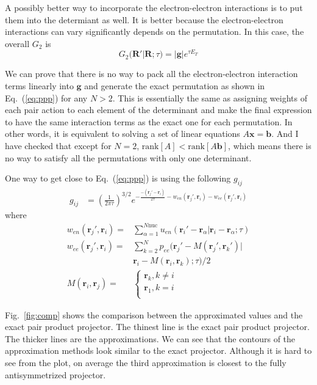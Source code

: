 \documentclass[aps,prl,reprint,groupedaddress]{revtex4-1}
\begin{document}
A possibly better way to incorporate the electron-electron interactions is to put them into the determiant as well.
It is better because the electron-electron interactions can vary significantly depends on the permutation.
In this case, the overall $G_2$ is
\begin{equation}
\label{eq:G2pppUee3}
G_2(\bm{R'}|\bm{R};\tau) = |\bm{g}|e^{\tau E_T}
\end{equation}

We can prove that there is no way to pack all the electron-electron interaction terms linearly into $\bm{g}$ and generate the exact permutation as shown in Eq.~(\ref{eq:ppp}) for any $N>2$.
This is essentially the same as assigning weights of each pair action to each element of the determinant and make the final expression to have the same interaction terms as the exact one for each permutation.
In other words, it is equivalent to solving a set of linear equations $A\bm{x}=\bm{b}$.
And I have checked that except for $N=2$, $\mathrm{rank}[A] < \mathrm{rank}[A \bm{b}]$, which means there is no way to satisfy all the permutations with only one determinant.

One way to get close to Eq.~(\ref{eq:ppp}) is using the following $g_{ij}$ \cite{umrigar2015observations}
\begin{align}
\label{eq:eq:gUee3}
g_{ij} & =
\left(\frac{1}{2\pi\tau} \right )^{3/2}e^{-\frac{-(\bm{r}_j'-\bm{r}_i)}{2\tau}-w_{en}(\bm{r}_j',\bm{r}_i)-w_{ee}(\bm{r}_j', \bm{r}_i)}
\end{align}
where
\begin{align}
w_{en}(\bm{r}_j',\bm{r}_i) = &
\sum\limits_{\alpha=1}^{N\mathrm{nuc}}u_{en}(\bm{r}_i'-\bm{r}_\alpha|\bm{r}_i-\bm{r}_\alpha;\tau)\\
w_{ee}(\bm{r}_j',\bm{r}_i) = &
\sum\limits_{k=2}^{N}p_{ee}(\bm{r}_j'-M(\bm{r}_j',\bm{r}_k')|\\
 & \bm{r}_i-M(\bm{r}_i,\bm{r}_k);\tau)/2\\
M(\bm{r}_i,\bm{r}_j) = &
\left\{\begin{matrix}
\bm{r}_k, k \neq i\\
\bm{r}_1, k = i\\
\end{matrix}\right.
\end{align}

Fig.~\ref{fig:comp} shows the comparison between the approximated values and the exact pair product projector.
The thinest line is the exact pair product projector.
The thicker lines are the approximations.
We can see that the contours of the approximation methods look similar to the exact projector.
Although it is hard to see from the plot, on average the third approximation is closest to the
fully antisymmetrized projector.
\end{document}
